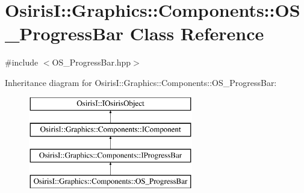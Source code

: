 \hypertarget{class_osiris_i_1_1_graphics_1_1_components_1_1_o_s___progress_bar}{\section{Osiris\-I\-:\-:Graphics\-:\-:Components\-:\-:O\-S\-\_\-\-Progress\-Bar Class Reference}
\label{class_osiris_i_1_1_graphics_1_1_components_1_1_o_s___progress_bar}
}


{\ttfamily \#include $<$O\-S\-\_\-\-Progress\-Bar.\-hpp$>$}

Inheritance diagram for Osiris\-I\-:\-:Graphics\-:\-:Components\-:\-:O\-S\-\_\-\-Progress\-Bar\-:\begin{figure}[H]
\begin{center}
\leavevmode
\includegraphics[height=4.000000cm]{class_osiris_i_1_1_graphics_1_1_components_1_1_o_s___progress_bar}
\end{center}
\end{figure}
